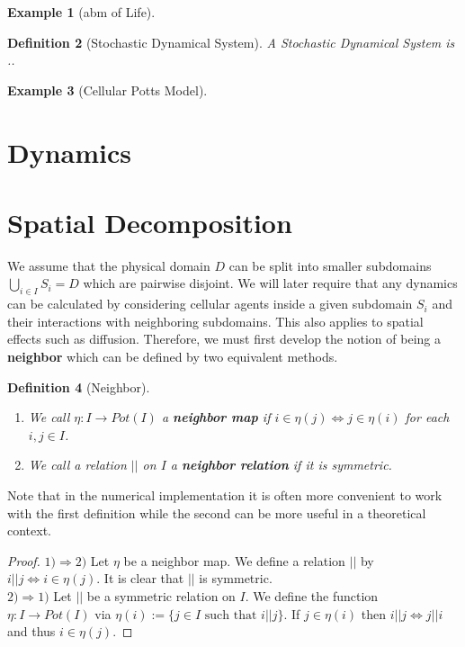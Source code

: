 \documentclass{article}
\newtheorem{definition}{Definition}[section]
\newtheorem{example}[definition]{Example}
\begin{document}
\begin{example}[\ac{abm} of Life]
\end{example}


\begin{definition}[Stochastic Dynamical System]
    A Stochastic Dynamical System is ..
\end{definition}

\begin{example}[Cellular Potts Model]
\end{example}


\section{Dynamics}

\section{Spatial Decomposition}
We assume that the physical domain $D$ can be split into smaller subdomains
$\bigcup_{i\in I}S_i=D$ which are pairwise disjoint.
We will later require that any dynamics can be calculated by considering cellular agents inside a
given subdomain $S_i$ and their interactions with neighboring subdomains.
This also applies to spatial effects such as diffusion.
Therefore, we must first develop the notion of being a \textbf{neighbor} which can be defined by
two equivalent methods.

\begin{definition}[Neighbor]
\hspace{0cm}
    \begin{enumerate}
        \item We call $\eta:I\rightarrow Pot(I)$ a \textbf{neighbor map} if
            $i\in\eta(j) \Leftrightarrow j\in\eta(i)$ for each $i,j\in I$.
        \item We call a relation $||$ on $I$ a \textbf{neighbor relation} if it is symmetric.
    \end{enumerate}
\end{definition}

Note that in the numerical implementation it is often more convenient to work with the first
definition while the second can be more useful in a theoretical context.

\begin{proof}
    $1) \Rightarrow 2)$ Let $\eta$ be a neighbor map.
    We define a relation $||$ by $i||j \Leftrightarrow i\in\eta(j)$.
    It is clear that $||$ is symmetric.\\
    $2) \Rightarrow 1)$ Let $||$ be a symmetric relation on $I$.
    We define the function $\eta:I\rightarrow Pot(I)$ via
    $\eta(i):=\{j\in I \text{ such that } i||j\}$.
    If $j\in\eta(i)$ then $i||j \Leftrightarrow j||i$ and thus $i\in\eta(j)$.
\end{proof}
\end{document}
